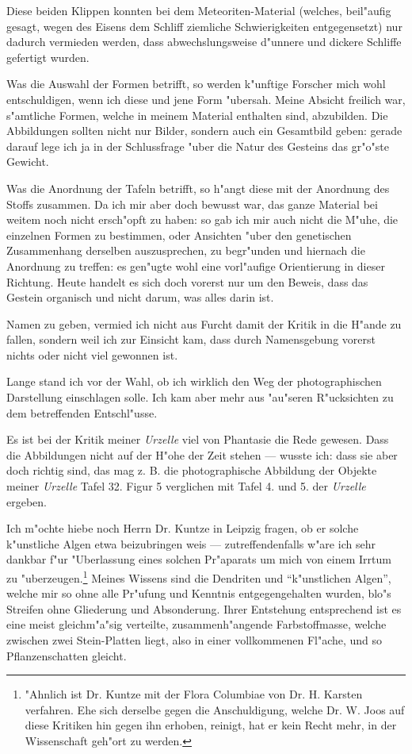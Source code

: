 \documentclass[a4paper, 11pt, oneside]{article}
\begin{document}
Diese beiden Klippen konnten bei dem Meteoriten-Material (welches, beil"aufig gesagt, wegen des Eisens dem Schliff ziemliche Schwierigkeiten entgegensetzt) nur dadurch vermieden werden, dass abwechslungsweise d"unnere und dickere Schliffe gefertigt wurden.

Was die Auswahl der Formen betrifft, so werden k"unftige Forscher mich wohl entschuldigen, wenn ich diese und jene Form "ubersah. Meine Absicht freilich war, s"amtliche Formen, welche in meinem Material enthalten sind, abzubilden. Die Abbildungen sollten nicht nur Bilder, sondern auch ein Gesamtbild geben: gerade darauf lege ich ja in der Schlussfrage "uber die Natur des Gesteins das gr"o"ste Gewicht.

Was die Anordnung der Tafeln betrifft, so h"angt diese mit der Anordnung des Stoffs zusammen. Da ich mir aber doch bewusst war, das ganze Material bei weitem noch nicht ersch"opft zu haben: so gab ich mir auch nicht die M"uhe, die einzelnen Formen zu bestimmen, oder Ansichten "uber den genetischen Zusammenhang derselben auszusprechen, zu begr"unden und hiernach die Anordnung zu treffen: es gen"ugte wohl eine vorl"aufige Orientierung in dieser Richtung. Heute handelt es sich doch vorerst nur um den Beweis, dass das Gestein organisch und nicht darum, was alles darin ist.

Namen zu geben, vermied ich nicht aus Furcht damit der Kritik in die H"ande zu fallen, sondern weil ich zur Einsicht kam, dass durch Namensgebung vorerst nichts oder nicht viel gewonnen ist.

Lange stand ich vor der Wahl, ob ich wirklich den Weg der photographischen Darstellung einschlagen solle. Ich kam aber mehr aus "au"seren R"ucksichten zu dem betreffenden Entschl"usse.

Es ist bei der Kritik meiner \emph{Urzelle} viel von Phantasie die Rede gewesen. Dass die Abbildungen nicht auf der H"ohe der Zeit stehen --- wusste ich: dass sie aber doch richtig sind, das mag z. B. die photographische Abbildung der Objekte meiner \emph{Urzelle} Tafel 32. Figur 5 verglichen mit Tafel 4. und 5. der \emph{Urzelle} ergeben.

Ich m"ochte hiebe noch Herrn Dr. Kuntze in Leipzig fragen, ob er solche k"unstliche Algen etwa beizubringen weis --- zutreffendenfalls w"are ich sehr dankbar f"ur "Uberlassung eines solchen Pr"aparats um mich von einem Irrtum zu "uberzeugen.\footnote{"Ahnlich ist Dr. Kuntze mit der Flora Columbiae von Dr. H. Karsten verfahren. Ehe sich derselbe gegen die Anschuldigung, welche Dr. W. Joos auf diese Kritiken hin gegen ihn erhoben, reinigt, hat er kein Recht mehr, in der Wissenschaft geh"ort zu werden.} Meines Wissens sind die Dendriten und "`k"unstlichen Algen"', welche mir so ohne alle Pr"ufung und Kenntnis entgegengehalten wurden, blo"s Streifen ohne Gliederung und Absonderung. Ihrer Entstehung entsprechend ist es eine meist gleichm"a"sig verteilte, zusammenh"angende Farbstoffmasse, welche zwischen zwei Stein-Platten liegt, also in einer vollkommenen Fl"ache, und so Pflanzenschatten gleicht.
\end{document}

